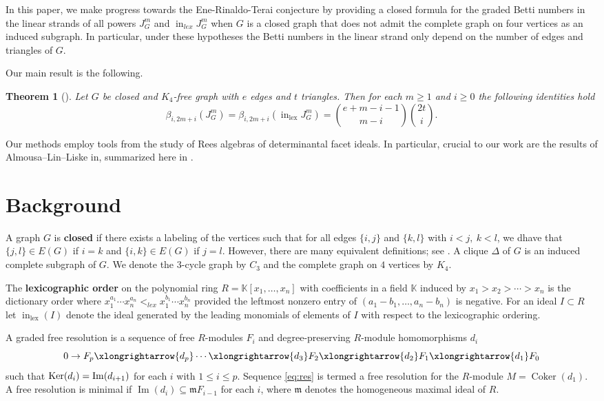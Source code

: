 \documentclass[reqno]{amsart}
\newtheorem*{introthm*}{Theorem}
\theoremstyle{definition}
\theoremstyle{remark}
\numberwithin{equation}{section}
\DeclareMathOperator{\init}{in}
\DeclareMathOperator{\lex}{lex}
\DeclareMathOperator{\Img}{Im}
\DeclareMathOperator{\coker}{Coker}
\begin{document}
    In this paper, we make progress towards the Ene-Rinaldo-Terai conjecture  by providing a closed formula for the graded Betti numbers in the linear strands of all powers $J_{G}^m$ and $\operatorname{in}_{lex}{J_{G}^m}$ when $G$ is a closed graph that does not admit the complete graph on four vertices as an induced subgraph. In particular, under these hypotheses the Betti numbers in the linear strand  only depend on the number of edges and triangles of $G$.
    
    Our main result is the following.
    
    \begin{introthm*}[] Let $G$ be closed and $K_4$-free graph with $e$ edges and $t$ triangles. Then for each $m\geq 1$ and $i\geq 0$ the following identities hold
   \[
   \beta_{i, 2m+i}(J_G^m)=\beta_{i, 2m+i}(\init_{\lex} J_G^m)=\binom{e+m-i-1}{m-i}\binom{2t}{i}.
   \] 
    \end{introthm*}

Our methods employ tools from the study of Rees algebras of determinantal facet ideals. In parti\-cu\-lar, crucial to our work are the results of Almousa--Lin--Liske in\cite{ALL}, summarized here in .
    
\section{Background}



A graph \(G\) is {\bf closed} if there exists a labeling of the vertices such that for all edges $\{i,j\}$ and $\{k,l\}$ with $i<j, \ k<l$, we dhave that $\{j,l\} \in E(G)$ if $i= k$ and $\{i,k\} \in E(G)$ if $j=l$. However, there are many equivalent definitions; see \cite[section 7.1.1]{HHO}. A clique $\Delta$ of $G$ is an induced complete subgraph of $G$. We denote the $3$-cycle graph by $C_3$ and the complete graph on $4$ vertices by $K_4$.


The {\bf lexicographic order} on the polynomial ring $R=\mathbb{K}[x_1, \ldots, x_n]$ with coefficients in a field $\mathbb{K}$ induced by $x_1 > x_2 > \cdots > x_n$ is the dictionary order where 
 $x_1^{a_1}\cdots x_n^{a_n}<_{lex}x_1^{b_1}\cdots x_n^{b_n}$ provided the leftmost nonzero entry of $(a_1-b_1, \ldots, a_n-b_n)$ is negative.
For an ideal  $I\subset R$  let $\init_{\lex}(I)$ denote the ideal generated by the leading monomials of elements of $I$ with respect to the lexicographic ordering. 


A graded free resolution is a sequence of free $R$-modules $F_i$ and degree-preserving $R$-module homomorphisms $d_i$ 
\begin{equation}
\label{eq:res}
0 \rightarrow F_p \xlongrightarrow{d_p}
\cdots \xlongrightarrow{d_3} F_2 \xlongrightarrow{d_2} F_1 \xlongrightarrow{d_1} F_0
 \end{equation}
such that  ${\rm Ker}(d_i)={\rm Im}(d_{i+1})$ for each $i$ with $1\leq i\leq p$. Sequence \eqref{eq:res} is termed a free resolution for the $R$-module $M=\coker(d_1)$.
A free resolution is  minimal if  $\Img(d_i)\subseteq \mathfrak{m}F_{i-1}$ for each $i$, where $\mathfrak{m}$ denotes the homogeneous maximal ideal of $R$. 
\end{document}
